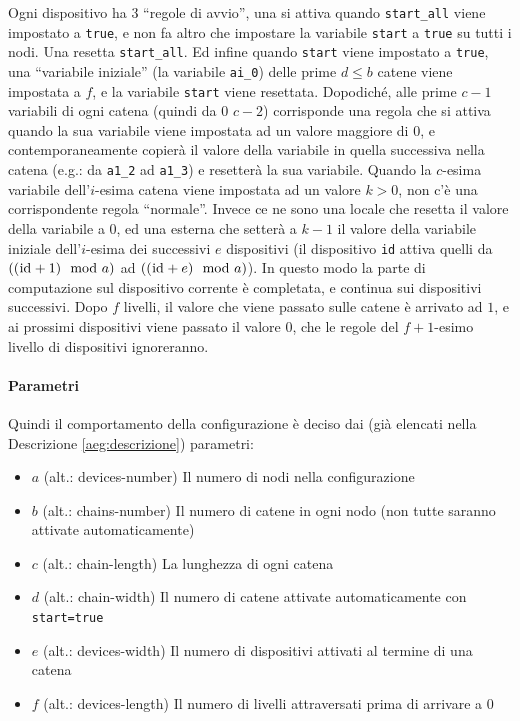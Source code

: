 \documentclass[12pt, a4paper]{article}
\begin{document}
Ogni dispositivo ha 3 ``regole di avvio'', una si attiva quando \lstinline{start_all} viene impostato a \lstinline{true}, e non fa altro che impostare la variabile \lstinline{start} a \lstinline{true} su tutti i nodi. Una resetta \lstinline{start_all}. Ed infine quando \lstinline{start} viene impostato a \lstinline{true}, una ``variabile iniziale'' (la variabile \lstinline{ai_0}) delle prime $d\leq b$ catene viene impostata a $f$, e la variabile \lstinline{start} viene resettata.
Dopodiché, alle prime $c-1$ variabili di ogni catena (quindi da $0$ $c-2$) corrisponde una regola che si attiva quando la sua variabile viene impostata ad un valore maggiore di $0$, e contemporaneamente copierà il valore della variabile in quella successiva nella catena (e.g.: da \lstinline{a1_2} ad \lstinline{a1_3}) e resetterà la sua variabile.
Quando la $c$-esima variabile dell'$i$-esima catena viene impostata ad un valore $k>0$, non c'è una corrispondente regola ``normale''. Invece ce ne sono una locale che resetta il valore della variabile a $0$, ed una esterna che setterà a $k-1$ il valore della variabile iniziale dell'$i$-esima dei successivi $e$ dispositivi (il dispositivo \lstinline{id} attiva quelli da $((\text{\lstinline{id}}+1)\mod a)$ ad $((\text{\lstinline{id}}+e)\mod a)$). In questo modo la parte di computazione sul dispositivo corrente è completata, e continua sui dispositivi successivi.
Dopo $f$ livelli, il valore che viene passato sulle catene è arrivato ad $1$, e ai prossimi dispositivi viene passato il valore $0$, che le regole del $f+1$-esimo livello di dispositivi ignoreranno.

\paragraph{Parametri}

Quindi il comportamento della configurazione è deciso dai (già elencati nella Descrizione \ref{aeg:descrizione}) parametri:
\begin{itemize}
    \item $a$ (alt.: devices-number) Il numero di nodi nella configurazione
    \item $b$ (alt.: chains-number) Il numero di catene in ogni nodo (non tutte saranno attivate automaticamente)
    \item $c$ (alt.: chain-length) La lunghezza di ogni catena
    \item $d$ (alt.: chain-width) Il numero di catene attivate automaticamente con \lstinline{start=true}
    \item $e$ (alt.: devices-width) Il numero di dispositivi attivati al termine di una catena
    \item $f$ (alt.: devices-length) Il numero di livelli attraversati prima di arrivare a $0$
\end{itemize}
\end{document}

